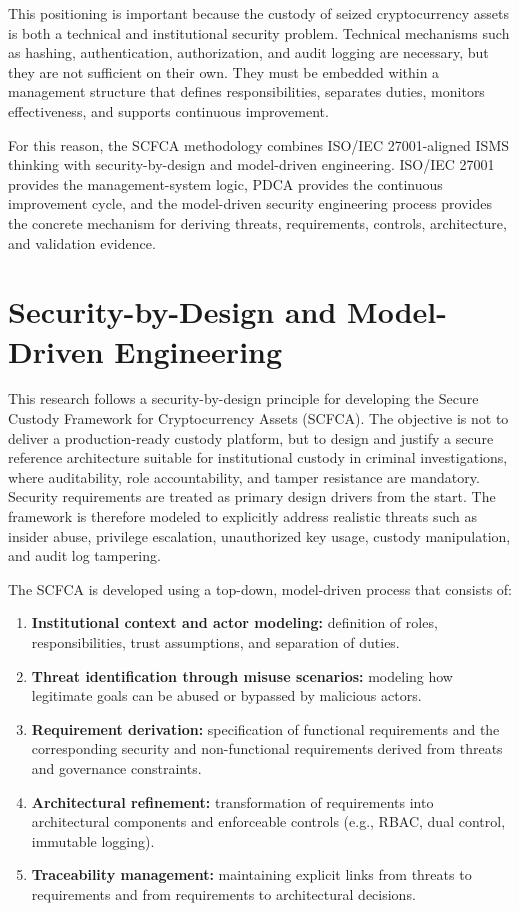 \documentclass[12pt,a4paper]{report}
\begin{document}
This positioning is important because the custody of seized cryptocurrency assets is both a technical and institutional security problem. Technical mechanisms such as hashing, authentication, authorization, and audit logging are necessary, but they are not sufficient on their own. They must be embedded within a management structure that defines responsibilities, separates duties, monitors effectiveness, and supports continuous improvement.

For this reason, the SCFCA methodology combines ISO/IEC 27001-aligned ISMS thinking with security-by-design and model-driven engineering. ISO/IEC 27001 provides the management-system logic, PDCA provides the continuous improvement cycle, and the model-driven security engineering process provides the concrete mechanism for deriving threats, requirements, controls, architecture, and validation evidence.

\section{Security-by-Design and Model-Driven Engineering}
This research follows a security-by-design principle for developing the Secure Custody Framework for Cryptocurrency Assets (SCFCA). The objective is not to deliver a production-ready custody platform, but to design and justify a secure reference architecture suitable for institutional custody in criminal investigations, where auditability, role accountability, and tamper resistance are mandatory.
Security requirements are treated as primary design drivers from the start. The framework is therefore modeled to explicitly address realistic threats such as insider abuse, privilege escalation, unauthorized key usage, custody manipulation, and audit log tampering.

The SCFCA is developed using a top-down, model-driven process that consists of:

\begin{enumerate}
    \item \textbf{Institutional context and actor modeling:} definition of roles, responsibilities, trust assumptions, and separation of duties.
    \item \textbf{Threat identification through misuse scenarios:} modeling how legitimate goals can be abused or bypassed by malicious actors.
    \item \textbf{Requirement derivation:} specification of functional requirements and the corresponding security and non-functional requirements derived from threats and governance constraints.
    \item \textbf{Architectural refinement:} transformation of requirements into architectural components and enforceable controls (e.g., RBAC, dual control, immutable logging).
    \item \textbf{Traceability management:} maintaining explicit links from threats to requirements and from requirements to architectural decisions.
\end{enumerate}
\end{document}
